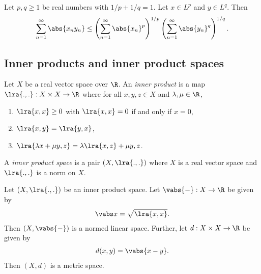 \documentclass{article}
\begin{document}
\begin{lemma}
    Let $p,q\geq 1$ be real numbers with $1/p+1/q=1$. Let $x\in L^p$ and $y\in L^q$. Then 
    \begin{align*}
        \sum_{n=1}^\infty \abs{x_ny_n}\leq 
        \left(\sum_{n=1}^\infty\abs{x_n}^p\right)^{1/p}
        \left(\sum_{n=1}^\infty\abs{y_n}^q\right)^{1/q}.
    \end{align*}
\end{lemma}

\subsection{Inner products and inner product spaces}

\begin{definition}
    Let $X$ be a real vector space over $\R$. An \emph{inner product}
    is a map $\lra{.,.}:X\times X\to\R$ where for all $x,y,z\in X$ and 
    $\lambda,\mu\in\R$,
    \begin{enumerate}
        \item $\lra{x,x}\geq 0$ with $\lra{x,x}=0$ if and only if $x=0$,
        \item $\lra{x,y}=\lra{y,x}$,
        \item $\lra{\lambda x+\mu y,z}=\lambda\lra{x,z}+\mu{y,z}$.
    \end{enumerate} 
    A \emph{inner product space} is a pair $(X, \lra{.,.})$ where $X$ is a real 
    vector space and $\lra{.,.}$ is a norm on $X$.
\end{definition}

\begin{lemma}
    Let $(X,\lra{.,.})$ be an inner product space. Let $\vabs{-}:X\to\R$ be given 
    by 
    \begin{align*}
        \vabs x = \sqrt{\lra{x,x}}.
    \end{align*}
    Then $(X,\vabs{-})$ is a normed linear space. Further, let $d:X\times X\to\R$
    be given by 
    \begin{align*}
        d(x,y)=\vabs{x-y}.
    \end{align*}
    Then $(X,d)$ is a metric space.
\end{lemma}
\end{document}

